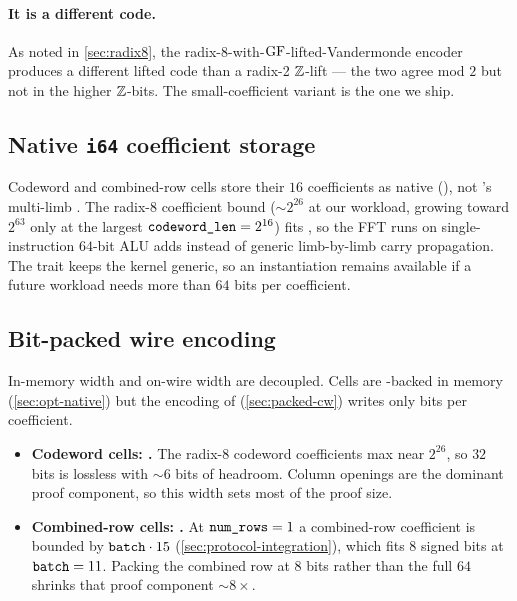 \paragraph{It is a different code.} As noted in \autoref{sec:radix8},
the radix-8-with-$\operatorname{GF}$-lifted-Vandermonde encoder produces a different
lifted code than a radix-2 $\mathbb{Z}$-lift --- the two agree mod $2$ but not
in the higher $\mathbb{Z}$-bits. The small-coefficient variant is the one we
ship.

\subsection{Native {\tt i64} coefficient storage}
\label{sec:opt-native}

Codeword and combined-row cells store their $16$ coefficients as
native  (), not
's multi-limb . The radix-8
coefficient bound ($\sim 2^{26}$ at our workload, growing toward
$2^{63}$ only at the largest $\texttt{codeword\_len} = 2^{16}$) fits
, so the FFT runs on single-instruction $64$-bit ALU adds
instead of generic limb-by-limb carry propagation. The
 trait keeps the kernel generic, so an
 instantiation remains available if a future workload
needs more than $64$ bits per coefficient.

\subsection{Bit-packed wire encoding}
\label{sec:opt-packing}

In-memory width and on-wire width are decoupled. Cells are
-backed in memory (\autoref{sec:opt-native}) but the
 encoding of 
(\autoref{sec:packed-cw}) writes only  bits per
coefficient.

\begin{itemize}
  \item \textbf{Codeword cells: .} The radix-8
    codeword coefficients max near $2^{26}$, so $32$ bits is lossless
    with $\sim 6$ bits of headroom. Column openings are the dominant
    proof component, so this width sets most of the proof size.
  \item \textbf{Combined-row cells: .} At
    $\texttt{num\_rows} = 1$ a combined-row coefficient is bounded by
    $\texttt{batch}\cdot 15$ (\autoref{sec:protocol-integration}), which
    fits $8$ signed bits at $\texttt{batch} = 11$. Packing the
    combined row at $8$ bits rather than the full $64$ shrinks that
    proof component $\sim 8\times$.
\end{itemize}

